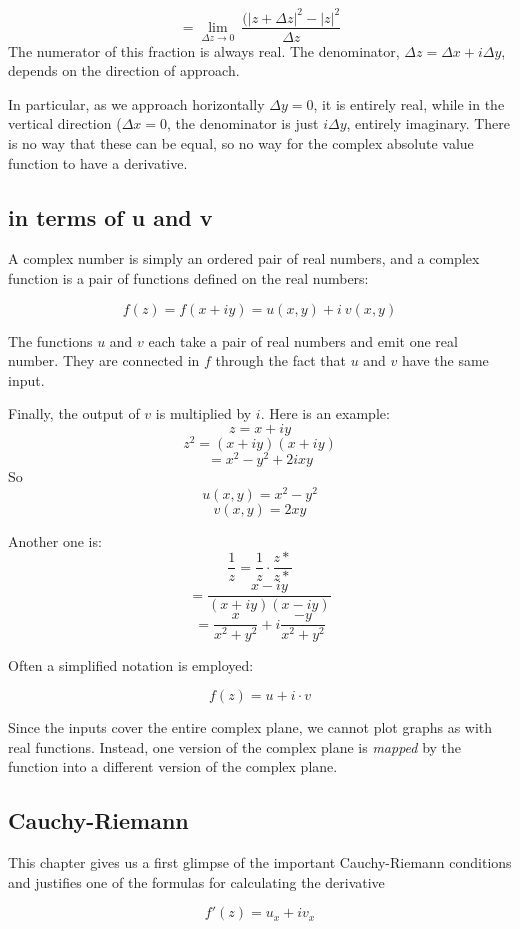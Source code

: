 \documentclass[11pt, oneside]{article}
\begin{document}
\[ = \lim_{\Delta z \rightarrow 0} \ \frac{(|z + \Delta z|^2 - |z|^2}{\Delta z} \]
The numerator of this fraction is always real.  The denominator, $\Delta z = \Delta x + i \Delta y$, depends on the direction of approach.  

In particular, as we approach horizontally $\Delta y = 0$, it is entirely real, while in the vertical direction ($\Delta x = 0$, the denominator is just $i \Delta y$, entirely imaginary.  There is no way that these can be equal, so no way for the complex absolute value function to have a derivative.

\subsection*{in terms of u and v}

A complex number is simply an ordered pair of real numbers, and a complex function is a pair of functions defined on the real numbers:

\[ f(z) = f(x + iy) = u(x,y) + i \ v(x,y) \]

The functions $u$ and $v$ each take a pair of real numbers and emit one real number.  They are connected in $f$ through the fact that $u$ and $v$ have the same input.

Finally, the output of $v$ is multiplied by $i$.  Here is an example:
\[ z = x + iy \]
\[ z^2 = (x + iy)(x + iy) \]
\[ = x^2 - y^2 + 2ixy \]
So
\[ u(x,y) = x^2 - y^2 \]
\[ v(x,y) = 2xy \]

Another one is:
\[ \frac{1}{z} = \frac{1}{z} \cdot \frac{z*}{z*} \]
\[ = \frac{x - iy}{(x + iy)(x - iy)} \]
\[ = \frac{x}{x^2 + y^2} + i \frac{-y}{x^2 + y^2} \]

Often a simplified notation is employed:

\[ f(z) = u + i \cdot v \]

Since the inputs cover the entire complex plane, we cannot plot graphs as with real functions.  Instead, one version of the complex plane is \emph{mapped} by the function into a different version of the complex plane.

\subsection*{Cauchy-Riemann}

This chapter gives us a first glimpse of the important Cauchy-Riemann conditions and justifies one of the formulas for calculating the derivative

\[ f'(z) = u_x + i v_x \]
\end{document}
